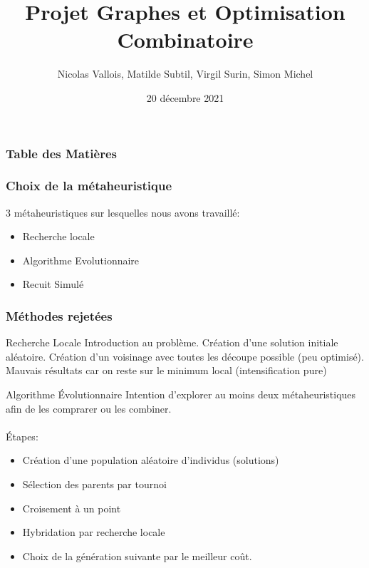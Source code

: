\documentclass{beamer}
\title{Projet Graphes et Optimisation Combinatoire}
\author{Nicolas Vallois, Matilde Subtil, Virgil Surin, Simon Michel}
\institute{Université de Mons}
\date{20 décembre 2021}
\begin{document}
\frame{\titlepage}


\begin{frame}
    \frametitle{Table des Matières}
    \tableofcontents
\end{frame}


\begin{frame}
    \frametitle{Choix de la métaheuristique}
    3 métaheuristiques sur lesquelles nous avons travaillé:
    \begin{itemize}
        \item Recherche locale
        \item Algorithme Evolutionnaire
        \item Recuit Simulé
    \end{itemize}

\end{frame}

\begin{frame}
    \frametitle{Méthodes rejetées}
    \begin{block}{Recherche Locale}
        Introduction au problème.
        Création d'une solution initiale aléatoire.
        Création d'un voisinage avec toutes les découpe possible (peu optimisé).
        \MVRightarrow{} Mauvais résultats car on reste sur le minimum local (intensification pure)
    \end{block}
    
\end{frame}

\begin{frame}
    \begin{block}{Algorithme Évolutionnaire}
        Intention d'explorer au moins deux métaheuristiques afin de les comprarer ou les combiner. \\~\\
        Étapes:
        \begin{itemize}
            \item Création d'une population aléatoire d'individus (solutions) 
            \item Sélection des parents par tournoi
            \item Croisement à un point 
            \item Hybridation par recherche locale
            \item Choix de la génération suivante par le meilleur coût.
        \end{itemize}
    \end{block}
\end{frame}
\end{document}
